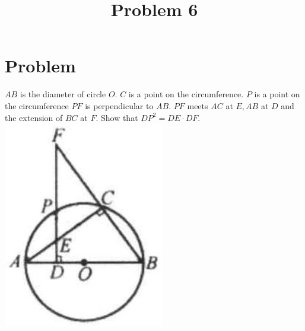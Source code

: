 \documentclass{article}
\title{Problem 6}
\date{}
\begin{document}
\maketitle

\section*{Problem}
\(A B\) is the diameter of circle \(O\). \(C\) is a point on the circumference. \(P\) is a point on the circumference \(P F\) is perpendicular to \(A B\). \(P F\) meets \(A C\) at \(E, A B\) at \(D\) and the extension of \(B C\) at \(F\). Show that \(D P^{2}=D E \cdot D F\).\\
\centering
\includegraphics[width=\textwidth]{images/problem_image_1.jpg}
\end{document}
